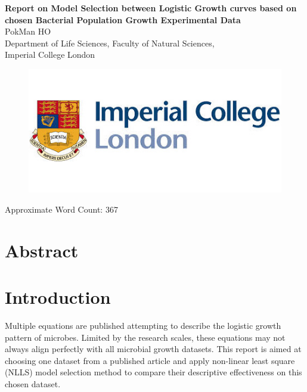 \documentclass[a4paper, 11pt]{article}
\title{\ReportTitle}
\author{\ReportAuthor (CID: 01786076)}
\date{}
\newcommand{\ReportTitle}{Report on Model Selection between Logistic Growth curves based on chosen Bacterial Population Growth Experimental Data} %
\newcommand{\ReportAuthor}{PokMan HO}
\newcommand{\ReportAffil}{Department of Life Sciences, Faculty of Natural Sciences,\\Imperial College London}
\begin{document}
	\begin{center}
		\Huge\textbf{\ReportTitle}\\
		\LARGE\ReportAuthor\\
		\Large\ReportAffil
	\end{center}
	\begin{figure}[h]
		\centering\includegraphics[width=\linewidth]{icl.jpg}
	\end{figure}
	\begin{flushright}
		\Large Approximate Word Count: %
367
	\end{flushright}
	\clearpage
	
	\maketitle
	\section*{Abstract}
	
	
	\section*{Introduction}
	Multiple equations are published attempting to describe the logistic growth pattern of microbes.  Limited by the research scales, these equations may not always align perfectly with all microbial growth datasets.  This report is aimed at choosing one dataset from a published article and apply non-linear least square (NLLS) model selection method to compare their descriptive effectiveness on this chosen dataset.
	
\end{document}
